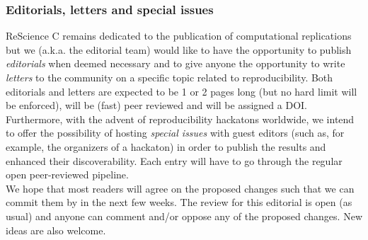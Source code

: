 \subsubsection{Editorials, letters and special issues}

ReScience C remains dedicated to the publication of computational replications
but we (a.k.a. the editorial team) would like to have the opportunity to
publish \emph{editorials} when deemed necessary and to give anyone the
opportunity to write \emph{letters} to the community on a specific topic
related to reproducibility. Both editorials and letters are expected to be 1 or
2 pages long (but no hard limit will be enforced), will be (fast) peer reviewed
and will be assigned a DOI. Furthermore, with the advent of reproducibility
hackatons worldwide, we intend to offer the possibility of hosting {\em special
  issues} with guest editors (such as, for example, the organizers of a
hackaton) in order to publish the results and enhanced their
discoverability. Each entry will have to go through the regular open
peer-reviewed pipeline.\\


We hope that most readers will agree on the proposed changes such that we can
commit them by in the next few weeks. The review for this editorial is open (as
usual) and anyone can comment and/or oppose any of the proposed changes. New
ideas are also welcome.
